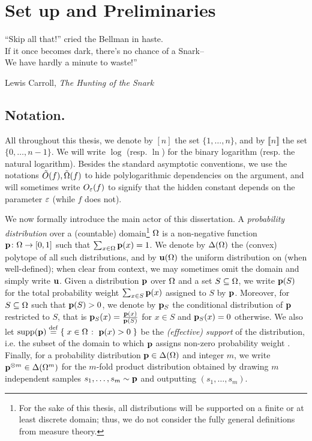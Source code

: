 \chapter{Set up and Preliminaries}\label{chap:preliminaries}

\epigraph{``Skip all that!'' cried the Bellman in haste.\\
If it once becomes dark, there's no chance of a Snark--\\
We have hardly a minute to waste!''}{Lewis Carroll, \textit{The Hunting of the Snark}}

\section{Notation.} 

All throughout this thesis, we denote by $[n]$ the set $\{1,\dots,n\}$, and by $\llbracket n\rrbracket$ the set $\{0,\dots,n-1\}$. We will write $\log$  (resp. $\ln$) for the binary logarithm (resp. the natural logarithm). Besides the standard asymptotic conventions, we use the notations $\tildeO{f},\tildeOmega{f}$ to hide polylogarithmic dependencies on the argument, and will sometimes write $O_\varepsilon(f)$ to signify that the hidden constant depends on the parameter $\varepsilon$ (while $f$ does not).

We now formally introduce the main actor of this dissertation. A \emph{probability distribution} over a (countable) domain\footnote{For the sake of this thesis, all distributions will be supported on a finite or at least discrete domain; thus, we do not consider the fully general definitions from measure theory.} ${\Omega}$ is a non-negative function $\mathbf{p}\colon{\Omega}\to[0,1]$ such that $\sum_{x\in{\Omega}} \mathbf{p}(x) = 1$. We denote by $\Delta\!\left({\Omega}\right)$ the (convex) polytope of all such distributions, and by $\mathbf{u}\!\left( {\Omega} \right) $ the uniform distribution on \domain (when well-defined); when clear from context, we may sometimes omit the domain and simply write $\mathbf{u}$. Given a distribution $\mathbf{p}$ over ${\Omega}$ and a set $S\subseteq{\Omega}$, we write $\mathbf{p}(S)$ for the total probability weight $\sum_{x\in S} \mathbf{p}(x)$ assigned to $S$ by $\mathbf{p}$. Moreover, for $S \subseteq {\Omega}$ such that $\mathbf{p}(S)>0$, we denote by $\mathbf{p}_S$ the conditional distribution of $\mathbf{p}$ restricted to $S$, that is $\mathbf{p}_S(x) = \frac{\mathbf{p}(x)}{\mathbf{p}(S)}$ for $x \in S$ and $\mathbf{p}_S(x)=0$ otherwise. We also let $\operatorname{supp}\!\left(\mathbf{p}\right)\stackrel{\rm def}{=}\left\{\;  x\in\Omega  \;\colon\;  \mathbf{p}(x) > 0 \; \right\}$ be the \emph{(effective) support} of the distribution, i.e. the subset of the domain to which $\mathbf{p}$ assigns non-zero probability weight . Finally, for a probability distribution $\mathbf{p}\in\Delta\!\left({\Omega}\right)$ and integer $m$, we write $\mathbf{p}^{\otimes m}\in\Delta\!\left({\Omega}^m\right)$ for the $m$-fold product distribution obtained by drawing $m$ independent samples $s_1,\dots,s_m\sim \mathbf{p}$ and outputting $(s_1,\dots,s_m)$.

